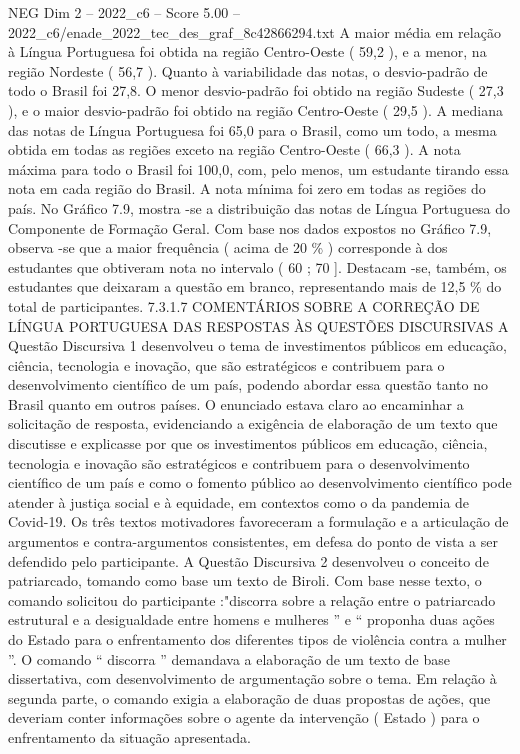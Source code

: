 \begin{textsample}{NEG Dim 2 – 2022\_c6 – Score 5.00 – 2022\_c6/enade\_2022\_tec\_des\_graf\_8c42866294.txt}
A maior média em relação à Língua Portuguesa foi obtida na região Centro-Oeste ( 59,2 ), e a menor, na região Nordeste ( 56,7 ).
Quanto à variabilidade das notas, o desvio-padrão de todo o Brasil foi 27,8.
O menor desvio-padrão foi obtido na região Sudeste ( 27,3 ), e o maior desvio-padrão foi obtido na região Centro-Oeste ( 29,5 ).
A mediana das notas de Língua Portuguesa foi 65,0 para o Brasil, como um todo, a mesma obtida em todas as regiões exceto na região Centro-Oeste ( 66,3 ).
A nota máxima para todo o Brasil foi 100,0, com, pelo menos, um estudante tirando essa nota em cada região do Brasil.
A nota mínima foi zero em todas as regiões do país.
No Gráfico 7.9, mostra -se a distribuição das notas de Língua Portuguesa do Componente de Formação Geral.
Com base nos dados expostos no Gráfico 7.9, observa -se que a maior frequência ( acima de 20 \% ) corresponde à dos estudantes que obtiveram nota no intervalo ( 60 ; 70 ].
Destacam -se, também, os estudantes que deixaram a questão em branco, representando mais de 12,5 \% do total de participantes. 7.3.1.7 COMENTÁRIOS SOBRE A CORREÇÃO DE LÍNGUA PORTUGUESA DAS RESPOSTAS ÀS QUESTÕES DISCURSIVAS A Questão Discursiva 1 desenvolveu o tema de investimentos públicos em educação, ciência, tecnologia e inovação, que são estratégicos e contribuem para o desenvolvimento científico de um país, podendo abordar essa questão tanto no Brasil quanto em outros países.
O enunciado estava claro ao encaminhar a solicitação de resposta, evidenciando a exigência de elaboração de um texto que discutisse e explicasse por que os investimentos públicos em educação, ciência, tecnologia e inovação são estratégicos e contribuem para o desenvolvimento científico de um país e como o fomento público ao desenvolvimento científico pode atender à justiça social e à equidade, em contextos como o da pandemia de Covid-19.
Os três textos motivadores favoreceram a formulação e a articulação de argumentos e contra-argumentos consistentes, em defesa do ponto de vista a ser defendido pelo participante.
A Questão Discursiva 2 desenvolveu o conceito de patriarcado, tomando como base um texto de Biroli.
Com base nesse texto, o comando solicitou do participante :"discorra sobre a relação entre o patriarcado estrutural e a desigualdade entre homens e mulheres ” e “ proponha duas ações do Estado para o enfrentamento dos diferentes tipos de violência contra a mulher ”.
O comando “ discorra ” demandava a elaboração de um texto de base dissertativa, com desenvolvimento de argumentação sobre o tema.
Em relação à segunda parte, o comando exigia a elaboração de duas propostas de ações, que deveriam conter informações sobre o agente da intervenção ( Estado ) para o enfrentamento da situação apresentada.

\end{textsample}
